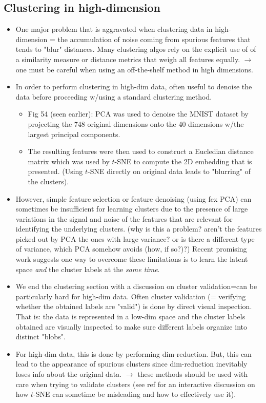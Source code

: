 \documentclass[norsk,a4paper,11pt]{article}
\begin{document}
\subsection{Clustering in high-dimension}
\begin{itemize}
	\item One major problem that is aggravated when clustering data in high-dimension = the accumulation of noise coming from spurious features that tends to "blur" distances. Many clustering algos rely on the explicit use of of a similarity measure or distance metrics that weigh all features equally. $\rightarrow$ one must be careful when using an off-the-shelf method in high dimensions.
	\item In order to perform clustering in high-dim data, often useful to denoise the data before proceeding w/using a standard clustering method. 
	\begin{itemize}
		\item Fig 54 (seen earlier): PCA was used to denoise the MNIST dataset by projecting the 748 original dimensions onto the 40 dimensions w/the largest principal components. 
		\item The resulting features were then used to construct a Eucledian distance matrix which was used by $t$-SNE to compute the 2D embedding that is presented. (Using $t$-SNE directly on original data leads to "blurring" of the clusters).
	\end{itemize}
	\item However, simple feature selection or feature denoising (using fex PCA) can sometimes be insufficient for learning clusters due to the presence of large variations in the signal and noise of the features that are relevant for identifying the underlying clusters. (why is this a problem? aren't the features picked out by PCA the ones with large variance? or is there a different type of variance, which PCA somehow avoids (how, if so?)?) Recent promising work suggests one way to overcome these limitations is to learn the latent space \textit{and} the cluster labels at the \textit{same time}.
	\item We end the clustering section with a discussion on cluster validation=can be particularly hard for high-dim data. Often cluster validation (= verifying whether the obtained labels are "valid") is done by direct visual inspection. That is: the data is represented in a low-dim space and the cluster labels obtained are visually inspected to make sure different labels organize into distinct "blobs".
	\item For high-dim data, this is done by performing dim-reduction. But, this can lead to the appearance of spurious clusters since dim-reduction inevitably loses info about the original data. $\rightarrow$ these methods should be used with care when trying to validate clusters (see ref for an interactive discussion on how $t$-SNE can sometime be misleading and how to effectively use it).

\end{itemize}
\end{document}
